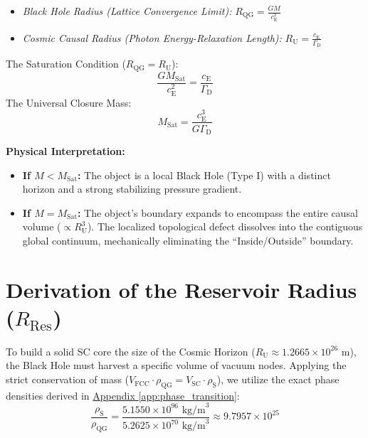 \begin{itemize}
    \item \textit{Black Hole Radius (Lattice Convergence Limit):} $R_{\mathrm{QG}} = \frac{GM}{c_{\mathrm{E}}^2}$
    \item \textit{Cosmic Causal Radius (Photon Energy-Relaxation Length):} $R_{\mathrm{U}} = \frac{c_{\mathrm{E}}}{\Gamma_{\mathrm{D}}}$
\end{itemize}

\noindent The Saturation Condition ($R_{\mathrm{QG}} = R_{\mathrm{U}}$):
\begin{equation}
    \frac{G M_{\mathrm{Sat}}}{c_{\mathrm{E}}^2} = \frac{c_{\mathrm{E}}}{\Gamma_{\mathrm{D}}}
\end{equation}
The Universal Closure Mass:
\begin{equation}
    M_{\mathrm{Sat}} = \frac{c_{\mathrm{E}}^3}{G \Gamma_{\mathrm{D}}}
\end{equation}

\vspace{0.5em}
\begin{minipage}{\textwidth}
\textbf{Physical Interpretation:}
\begin{itemize}
    \item \textbf{If $M < M_{\mathrm{Sat}}$:} The object is a local Black Hole (Type I) with a distinct horizon and a strong stabilizing pressure gradient.
    \item \textbf{If $M = M_{\mathrm{Sat}}$:} The object's boundary expands to encompass the entire causal volume ($\propto R_{\mathrm{U}}^3$). The localized topological defect dissolves into the contiguous global continuum, mechanically eliminating the ``Inside/Outside'' boundary.
\end{itemize}
\end{minipage}

\vspace{0.5em}
\section{Derivation of the Reservoir Radius ($R_{\mathrm{Res}}$)}
\label{sec:reservoir_radius}

To build a solid SC core the size of the Cosmic Horizon ($R_{\mathrm{U}} \approx 1.2665 \times 10^{26}$ m), the Black Hole must harvest a specific volume of vacuum nodes. Applying the strict conservation of mass ($V_{\mathrm{FCC}} \cdot \rho_{\mathrm{QG}} = V_{\mathrm{SC}} \cdot \rho_{\mathrm{S}}$), we utilize the exact phase densities derived in \hyperref[app:phase_transition]{Appendix \ref*{app:phase_transition}}:
\begin{equation}
    \frac{\rho_{\mathrm{S}}}{\rho_{\mathrm{QG}}} = \frac{5.1550 \times 10^{96} \text{ kg/m}^3}{5.2625 \times 10^{70} \text{ kg/m}^3} \approx 9.7957 \times 10^{25}
\end{equation}

